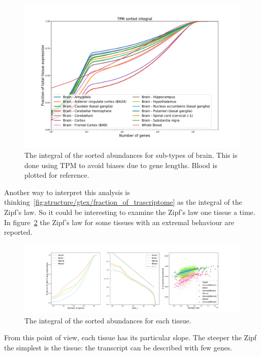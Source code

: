 \begin{figure}[htb!]
  \centering
  \includegraphics[width=0.65\linewidth]{pictures/structure/gtex/fraction_of_trascriptome_Brain.pdf}
  \caption{The integral of the sorted abundances for sub-types of brain. This is done using TPM to avoid biases due to gene lengths. Blood is plotted for reference.}
  \label{fig:structure/gtex/fraction_of_trascriptome_Brain}
\end{figure}

Another way to interpret this analysis is thinking~\ref{fig:structure/gtex/fraction_of_trascriptome} as the integral of the Zipf's law. So it could be interesting to examine the Zipf's law one tissue a time. In figure~\ref{fig:structure/gtex/zipf_tissue} the Zipf's law for some tissues with an extremal behaviour are reported.
\begin{figure}[htb!]
  \centering
  \includegraphics[width=0.45\linewidth]{pictures/structure/gtex/zipf_tissue.pdf}
  \caption{The integral of the sorted abundances for each tissue.}
  \label{fig:structure/gtex/zipf_tissue}
\end{figure}
From this point of view, each tissue has its particular slope. The steeper the Zipf the simplest is the tissue: the transcript can be described with few genes.

